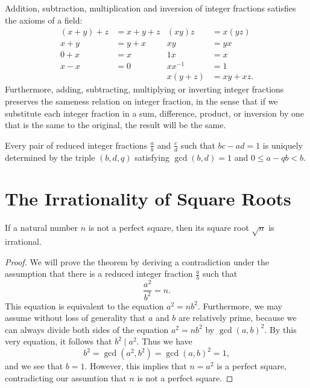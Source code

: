 \begin{theorem}
  Addition, subtraction, multiplication and inversion of integer fractions satisfies the axioms of a field:
  \begin{align*}
    (x+y)+z & = x + y+ z & (xy)z & = x(yz) \\
    x+y & = y+x & xy &= yx \\
    0+x & = x & 1x & = x \\
    x-x & = 0 & xx^{-1} & = 1 \\
    & & x(y+z) & = xy+xz.
  \end{align*}
  Furthermore, adding, subtracting, multiplying or inverting integer fractions preserves the sameness relation on integer fraction, in the sense that if we substitute each integer fraction in a sum, difference, product, or inversion by one that is the same to the original, the result will be the same.
\end{theorem}

\begin{theorem}
  Every pair of reduced integer fractions $\tfrac{a}{b}$ and $\tfrac{c}{d}$ such that $bc-ad=1$ is uniquely determined by the triple $(b,d,q)$ satisfying $\gcd(b,d)=1$ and $0\leq a-qb<b$.
\end{theorem}

\section{The Irrationality of Square Roots}

\begin{theorem}\label{theorem:irrational-sqrt}
  If a natural number $n$ is not a perfect square, then its square root $\sqrt{n}$ is irrational.
\end{theorem}

\begin{proof}
  We will prove the theorem by deriving a contradiction under the assumption that there is a reduced integer fraction $\frac{a}{b}$ such that
  \begin{equation*}
    \frac{a^2}{b^2}=n.
  \end{equation*}
  This equation is equivalent to the equation $a^2=nb^2$. Furthermore, we may assume without loss of generality that $a$ and $b$ are relatively prime, because we can always divide both sides of the equation $a^2=n b^2$ by $\gcd(a,b)^2$. By this very equation, it follows that $b^2\mid a^2$. Thus we have
  \begin{equation*}
    b^2=\gcd(a^2,b^2)=\gcd(a,b)^2=1,
  \end{equation*}
  and we see that $b=1$. However, this implies that $n=a^2$ is a perfect square, contradicting our assumtion that $n$ is not a perfect square.
\end{proof}

